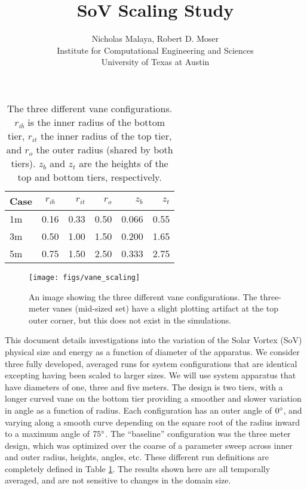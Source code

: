 \documentclass[english]{article}
\title{\bf{SoV Scaling Study}}
\author{Nicholas Malaya, Robert D. Moser \\ Institute for Computational Engineering and Sciences \\ University of Texas at Austin} \date{}
\begin{document}
\maketitle

\begin{table}
\begin{centering}
  \begin{tabular}{ | l || c | r | r | r | r |}
    \hline     
    Case & $r_{ib}$ & $r_{it}$ & $r_{o}$ & $z_{b}$ & $z_{t}$ \\ \hline \hline
    1m   & 0.16     & 0.33     & 0.50    & 0.066   & 0.55 \\ \hline
    3m   & 0.50     & 1.00     & 1.50    & 0.200   & 1.65 \\ \hline
    5m   & 0.75     & 1.50     & 2.50    & 0.333   & 2.75 \\
    \hline 
  \end{tabular}
  \caption{The three different vane configurations. $r_{ib}$ is the inner radius of the bottom tier, 
    $r_{it}$ the inner radius of the top tier, and $r_{o}$ the outer radius (shared by both tiers). 
    $z_{b}$ and $z_{t}$ are the heights of the top and bottom tiers, respectively. }\label{fig:scaling_table}
\end{centering}
\end{table}
%

\begin{figure}[!htb]
  \begin{center}
    \texttt{[image: figs/vane\_scaling]}
    \caption{An image showing the three different vane configurations. The three-meter vanes (mid-sized set) 
      have a slight plotting artifact at the top outer corner, but this does not exist in the simulations. }
    \label{vane_scaling}
  \end{center}
\end{figure}


This document details investigations into the variation of the Solar Vortex (SoV) physical size and energy as a function of diameter of the apparatus. We consider 
three fully developed, averaged runs for system configurations that are identical excepting having been scaled to larger sizes. We will use 
system apparatus that have diameters of one, three and five meters. The design is two tiers, with a longer curved vane on the bottom tier providing a 
smoother and slower variation in angle as a function of radius. Each configuration has an outer angle of $0\degree$, and varying along a smooth curve 
depending on the square root of the radius inward to a maximum angle of $75\degree$. The ``baseline'' configuration was the three meter design, 
which was optimized over the coarse of a parameter sweep across inner and outer radius, heights, angles, etc. These different run 
definitions are completely defined in Table \ref{fig:scaling_table}. The results shown here are all temporally averaged, and are not sensitive to changes in the domain size.
\end{document}
